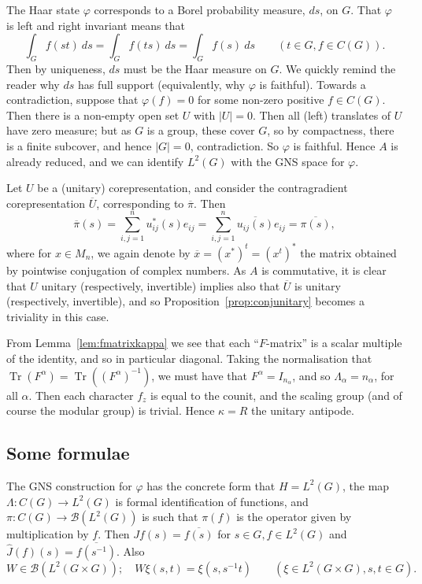 \documentclass[twoside,a4paper,12pt]{article}
\theoremstyle{plain}
\theoremstyle{definition}
\newcommand{\mc}{\mathcal}
\newcommand{\tr}{\operatorname{Tr}}
\begin{document}
The Haar state $\varphi$ corresponds to a Borel probability measure, $ds$, on
$G$.  That $\varphi$ is left and right invariant means that
\[ \int_G f(st) \ ds = \int_G f(ts) \ ds = \int_G f(s) \ ds
\qquad (t\in G, f\in C(G)). \]
Then by uniqueness, $ds$ must be the Haar measure on $G$.  We quickly remind
the reader why $ds$ has full support (equivalently, why $\varphi$ is faithful).
Towards a contradiction, suppose that $\varphi(f)=0$ for some non-zero positive
$f\in C(G)$.  Then there is a non-empty open set $U$ with $|U|=0$.  Then all
(left) translates of $U$ have zero measure; but as $G$ is a group, these cover
$G$, so by compactness, there is a finite subcover, and hence $|G|=0$,
contradiction.  So $\varphi$ is faithful.  Hence $A$ is already reduced,
and we can identify $L^2(G)$ with the GNS space for $\varphi$.

Let $U$ be a (unitary) corepresentation, and consider the contragradient
corepresentation $\overline{U}$, corresponding to $\overline{\pi}$.  Then
\[ \overline{\pi}(s) = \sum_{i,j=1}^n u_{ij}^*(s) e_{ij}
= \sum_{i,j=1}^n \overline{u_{ij}(s)} e_{ij}
= \overline{\pi(s)}, \]
where for $x\in M_n$, we again denote by $\overline{x} = (x^*)^t = (x^t)^*$ the
matrix obtained by pointwise conjugation of complex numbers.  As $A$ is
commutative, it is clear that $U$ unitary (respectively, invertible) implies
also that $\overline{U}$ is unitary (respectively, invertible), and so
Proposition~\ref{prop:conjunitary} becomes a triviality in this case.

From Lemma~\ref{lem:fmatrixkappa} we see that each ``$F$-matrix'' is a scalar
multiple of the identity, and so in particular diagonal.  Taking the normalisation
that $\tr(F^\alpha) = \tr((F^\alpha)^{-1})$, we must have that
$F^\alpha=I_{n_\alpha}$, and so $\Lambda_\alpha=n_\alpha$, for all $\alpha$.
Then each character $f_z$ is equal to the counit, and the scaling group (and of
course the modular group) is trivial.  Hence $\kappa=R$ the unitary antipode.

\subsection{Some formulae}

The GNS construction for $\varphi$ has the concrete form that $H=L^2(G)$,
the map $\Lambda:C(G)\rightarrow L^2(G)$ is formal identification of functions,
and $\pi:C(G)\rightarrow\mc B(L^2(G))$ is such that $\pi(f)$ is the operator
given by multiplication by $f$.  Then $Jf(s) = \overline{f(s)}$ for $s\in G,
f\in L^2(G)$ and $\hat J(f)(s) = \overline{f(s^{-1})}$.  Also
\[ W\in\mc B(L^2(G\times G)); \quad W\xi(s,t) = \xi(s,s^{-1}t)
\qquad(\xi\in L^2(G\times G), s,t\in G). \]
\end{document}
